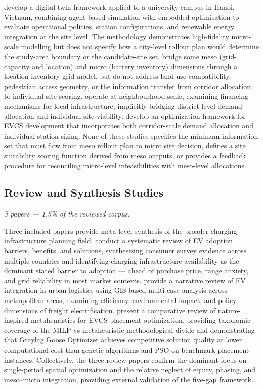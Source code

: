 \documentclass[12pt,letterpaper]{article}
\begin{document}
\citet{do2025} develop a digital twin framework applied to a university
campus in Hanoi, Vietnam, combining agent-based simulation with embedded
optimisation to evaluate operational policies, station configurations,
and renewable energy integration at the site level.  The methodology
demonstrates high-fidelity micro-scale modelling but does not specify
how a city-level rollout plan would determine the study-area boundary or
the candidate-site set.  \citet{ai2025} bridge some meso (grid-capacity
and location) and micro (battery inventory) dimensions through a
location-inventory-grid model, but do not address land-use compatibility,
pedestrian access geometry, or the information transfer from corridor
allocation to individual site scoring.  \citet{erfani2024} operate at
neighbourhood scale, examining financing mechanisms for local
infrastructure, implicitly bridging district-level demand allocation and
individual site viability.  \citet{jin2022} develop an optimization
framework for EVCS development that incorporates both corridor-scale
demand allocation and individual station sizing.  None of these studies
specifies the minimum information set that must flow from meso rollout
plan to micro site decision, defines a site suitability scoring function
derived from meso outputs, or provides a feedback procedure for
reconciling micro-level infeasibilities with meso-level allocations.

\subsection{Review and Synthesis Studies}

\textit{3 papers --- 1.5\% of the reviewed corpus.}

Three included papers provide meta-level synthesis of the broader
charging infrastructure planning field.  \citet{varma2023} conduct a
systematic review of EV adoption barriers, benefits, and solutions,
synthesizing consumer survey evidence across multiple countries and
identifying charging infrastructure availability as the dominant stated
barrier to adoption --- ahead of purchase price, range anxiety, and grid
reliability in most market contexts.  \citet{munawar2024} provide a
narrative review of EV integration in urban logistics using GIS-based
multi-case analysis across metropolitan areas, examining efficiency,
environmental impact, and policy dimensions of freight electrification.
\citet{alhussan2024} present a comparative review of nature-inspired
metaheuristics for EVCS placement optimization, providing taxonomic
coverage of the MILP-vs-metaheuristic methodological divide and
demonstrating that Graylag Goose Optimizer achieves competitive solution
quality at lower computational cost than genetic algorithms and PSO on
benchmark placement instances.  Collectively, the three review papers
confirm the dominant focus on single-period spatial optimization and the
relative neglect of equity, phasing, and meso--micro integration, providing
external validation of the five-gap framework.
\end{document}
